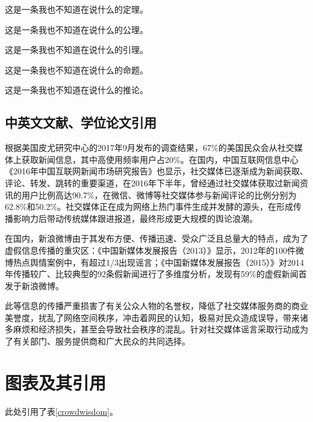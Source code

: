 \documentclass[a4paper,AutoFakeBold,oneside,12pt]{book}
\begin{document}
{{\begin{theorem}
这是一条我也不知道在说什么的定理。
\end{theorem}

\begin{axiom}
这是一条我也不知道在说什么的公理。
\end{axiom}

\begin{lemma}
这是一条我也不知道在说什么的引理。
\end{lemma}

\begin{proposition}
这是一条我也不知道在说什么的命题。
\end{proposition}

\begin{corollary}
这是一条我也不知道在说什么的推论。
\end{corollary}

\subsection{中英文文献、学位论文引用}
根据美国皮尤研究中心的2017年9月发布的调查结果\cite{pew_news_use_2017}，67\%的美国民众会从社交媒体上获取新闻信息，其中高使用频率用户占20\%。在国内，中国互联网信息中心《2016年中国互联网新闻市场研究报告》\cite{internet_news_2016}也显示，社交媒体已逐渐成为新闻获取、评论、转发、跳转的重要渠道，在2016年下半年，曾经通过社交媒体获取过新闻资讯的用户比例高达90.7\%，在微信、微博等社交媒体参与新闻评论的比例分别为62.8\%和50.2\%。社交媒体正在成为网络上热门事件生成并发酵的源头，在形成传播影响力后带动传统媒体跟进报道，最终形成更大规模的舆论浪潮。

在国内，新浪微博由于其发布方便、传播迅速、受众广泛且总量大的特点，成为了虚假信息传播的重灾区：《中国新媒体发展报告（2013）》\cite{唐绪军2013中国新媒体发展报告}显示，2012年的100件微博热点舆情案例中，有超过1/3出现谣言；《中国新媒体发展报告（2015）》\cite{唐绪军2015中国新媒体发展报告}对2014年传播较广、比较典型的92条假新闻进行了多维度分析，发现有59\%的虚假新闻首发于新浪微博。

此等信息的传播严重损害了有关公众人物的名誉权，降低了社交媒体服务商的商业美誉度，扰乱了网络空间秩序，冲击着网民的认知，极易对民众造成误导，带来诸多麻烦和经济损失，甚至会导致社会秩序的混乱。针对社交媒体谣言采取行动成为了有关部门、服务提供商和广大民众的共同选择。\cite{周兴2017基于深度学习的谣言检测及模式挖掘}

\section{图表及其引用}
此处引用了表\ref{crowdwisdom}。

}}
\end{document}
